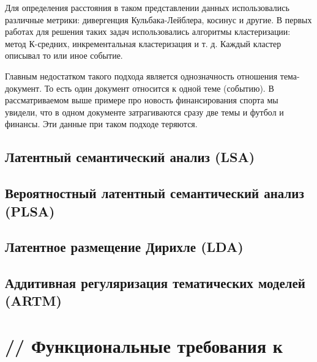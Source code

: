 Для определения расстояния в таком представлении данных использовались различные метрики: дивергенция Кульбака-Лейблера, косинус и другие. В первых работах для решения таких задач использовались алгоритмы кластеризации: метод К-средних, инкрементальная кластеризация и т. д. Каждый кластер описывал то или иное событие.

Главным недостатком такого подхода является однозначность отношения тема-документ. То есть один документ относится к одной теме (событию). В рассматриваемом выше примере про новость финансирования спорта мы увидели, что в одном документе затрагиваются сразу две темы и футбол и финансы. Эти данные при таком подходе теряются.

\subsection{Латентный семантический анализ (LSA)}

\subsection{Вероятностный латентный семантический анализ (PLSA)}

\subsection{Латентное размещение Дирихле (LDA)}

\subsection{Аддитивная регуляризация тематических моделей (ARTM)}

%
\section{// Функциональные требования к }
